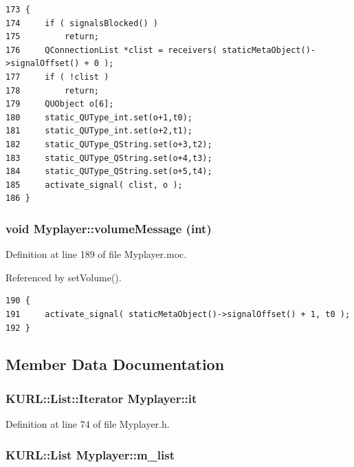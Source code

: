 \footnotesize\begin{verbatim}173 {
174     if ( signalsBlocked() )
175         return;
176     QConnectionList *clist = receivers( staticMetaObject()->signalOffset() + 0 );
177     if ( !clist )
178         return;
179     QUObject o[6];
180     static_QUType_int.set(o+1,t0);
181     static_QUType_int.set(o+2,t1);
182     static_QUType_QString.set(o+3,t2);
183     static_QUType_QString.set(o+4,t3);
184     static_QUType_QString.set(o+5,t4);
185     activate_signal( clist, o );
186 }
\end{verbatim}\normalsize 
{}
\subsubsection{\setlength{\rightskip}{0pt plus 5cm}void Myplayer::volume\-Message (int)\hspace{0.3cm}{\tt  [signal]}}\label{classMyplayer_Myplayerl1}




Definition at line 189 of file Myplayer.moc.

Referenced by set\-Volume().



\footnotesize\begin{verbatim}190 {
191     activate_signal( staticMetaObject()->signalOffset() + 1, t0 );
192 }
\end{verbatim}\normalsize 


\subsection{Member Data Documentation}
\subsubsection{\setlength{\rightskip}{0pt plus 5cm}KURL::List::Iterator {\bf Myplayer::it}\hspace{0.3cm}{\tt  [private]}}\label{classMyplayer_Myplayerr1}




Definition at line 74 of file Myplayer.h.
\subsubsection{\setlength{\rightskip}{0pt plus 5cm}KURL::List {\bf Myplayer::m\_\-list}\hspace{0.3cm}{\tt  [private]}}\label{classMyplayer_Myplayerr0}




